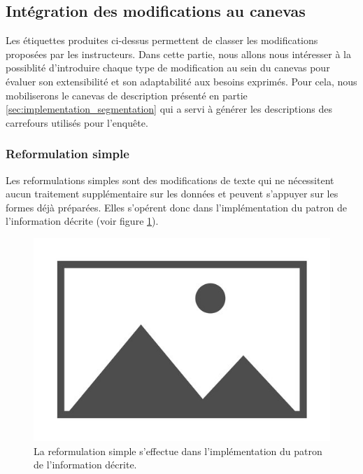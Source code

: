 \subsection{Intégration des modifications au canevas}
\label{sec:evaluation_pipeline}

Les étiquettes produites ci-dessus permettent de classer les modifications proposées par les instructeurs. Dans cette partie, nous allons nous intéresser à la possiblité d'introduire chaque type de modification au sein du canevas pour évaluer son  extensibilité et son adaptabilité aux besoins exprimés. Pour cela, nous mobiliserons le canevas de description présenté en partie \ref{sec:implementation_segmentation} qui a servi à générer les descriptions des carrefours utilisés pour l'enquête.


\subsubsection{Reformulation simple}

Les reformulations simples sont des modifications de texte qui ne nécessitent aucun traitement supplémentaire sur les données et peuvent s'appuyer sur les formes déjà préparées. Elles s'opérent donc dans l'implémentation du patron de l'information décrite (voir figure \ref{fig:evaluation_reformulation_simple}). 

\begin{figure}[ht]
    \centering
    \includegraphics{images/placeholder.jpg}
    \caption{La reformulation simple s'effectue dans l'implémentation du patron de l'information décrite.}
    \label{fig:evaluation_reformulation_simple}
\end{figure}

